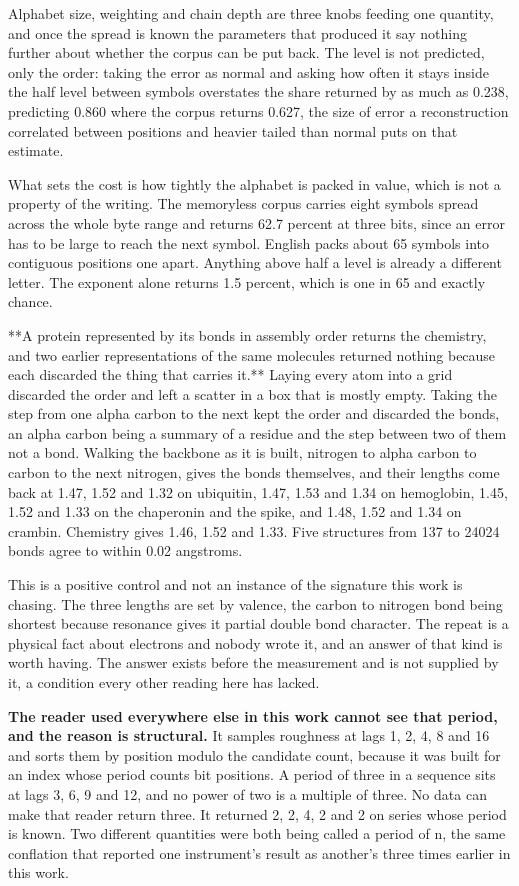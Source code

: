 Alphabet size, weighting and chain depth are three knobs feeding one quantity, and once the spread is known the parameters that produced it say nothing further about whether the corpus can be put back. The level is not predicted, only the order: taking the error as normal and asking how often it stays inside the half level between symbols overstates the share returned by as much as 0.238, predicting 0.860 where the corpus returns 0.627, the size of error a reconstruction correlated between positions and heavier tailed than normal puts on that estimate.

What sets the cost is how tightly the alphabet is packed in value, which is not a property of the writing. The memoryless corpus carries eight symbols spread across the whole byte range and returns 62.7 percent at three bits, since an error has to be large to reach the next symbol. English packs about 65 symbols into contiguous positions one apart. Anything above half a level is already a different letter. The exponent alone returns 1.5 percent, which is one in 65 and exactly chance.

**A protein represented by its bonds in assembly order returns the chemistry, and two earlier representations of the same molecules returned nothing because each discarded the thing that carries it.** Laying every atom into a grid discarded the order and left a scatter in a box that is mostly empty. Taking the step from one alpha carbon to the next kept the order and discarded the bonds, an alpha carbon being a summary of a residue and the step between two of them not a bond. Walking the backbone as it is built, nitrogen to alpha carbon to carbon to the next nitrogen, gives the bonds themselves, and their lengths come back at 1.47, 1.52 and 1.32 on ubiquitin, 1.47, 1.53 and 1.34 on hemoglobin, 1.45, 1.52 and 1.33 on the chaperonin and the spike, and 1.48, 1.52 and 1.34 on crambin. Chemistry gives 1.46, 1.52 and 1.33. Five structures from 137 to 24024 bonds agree to within 0.02 angstroms.

This is a positive control and not an instance of the signature this work is chasing. The three lengths are set by valence, the carbon to nitrogen bond being shortest because resonance gives it partial double bond character. The repeat is a physical fact about electrons and nobody wrote it, and an answer of that kind is worth having. The answer exists before the measurement and is not supplied by it, a condition every other reading here has lacked.

\textbf{The reader used everywhere else in this work cannot see that period, and the reason is structural.} It samples roughness at lags 1, 2, 4, 8 and 16 and sorts them by position modulo the candidate count, because it was built for an index whose period counts bit positions. A period of three in a sequence sits at lags 3, 6, 9 and 12, and no power of two is a multiple of three. No data can make that reader return three. It returned 2, 2, 4, 2 and 2 on series whose period is known. Two different quantities were both being called a period of n, the same conflation that reported one instrument's result as another's three times earlier in this work.


